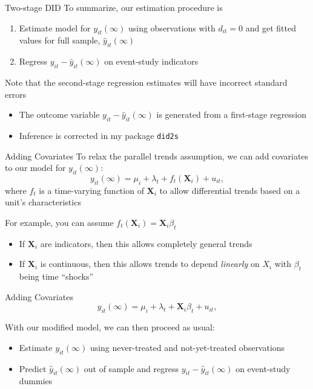 \documentclass[aspectratio=169,t,11pt,table]{beamer}
\begin{document}
\begin{frame}{Two-stage DID}
  To summarize, our estimation procedure is 
  \begin{enumerate}
    \item Estimate model for $y_{it}(\infty)$ using observations with $d_{it} = 0$ and get fitted values for full sample, $\hat{y}_{it}(\infty)$
    
    \item Regress $y_{it} - \hat{y}_{it}(\infty)$ on event-study indicators
  \end{enumerate}

  \pause
  \bigskip
  Note that the second-stage regression estimates will have incorrect standard errors
  \begin{itemize}
    \item The outcome variable $y_{it} - \hat{y}_{it}(\infty)$ is generated from a first-stage regression
    
    \item Inference is corrected in my package \texttt{did2s}
  \end{itemize}
\end{frame}

\begin{frame}{Adding Covariates}
  To relax the parallel trends assumption, we can add covariates to our model for $y_{it}(\infty)$:
  $$
    y_{it}(\infty) = \mu_i + \lambda_t  + f_t(\bm{X}_i) + u_{it},
  $$
  where $f_t$ is a time-varying function of $\bm{X}_i$ to allow differential trends based on a unit's characteristics

  \bigskip
  \pause
  For example, you can assume $f_t(\bm{X}_i) = \bm{X}_i \beta_t$
  \begin{itemize}
    \item If $\bm{X}_i$ are indicators, then this allows completely general trends
    
    \item If $\bm{X}_i$ is continuous, then this allows trends to depend \emph{linearly} on $X_i$ with $\beta_t$ being time ``shocks''
  \end{itemize}
\end{frame}

\begin{frame}{Adding Covariates}
  \vspace*{-\bigskipamount}
  $$
    y_{it}(\infty) = \mu_i + \lambda_t  + \bm{X}_i \beta_t + u_{it},
  $$

  With our modified model, we can then proceed as usual:
  \begin{itemize}
    \item Estimate $y_{it}(\infty)$ using never-treated and not-yet-treated observations
    
    \item Predict $\hat{y}_{it}(\infty)$ out of sample and regress $y_{it} - \hat{y}_{it}(\infty)$ on event-study dummies
  \end{itemize}
\end{frame}
\end{document}

